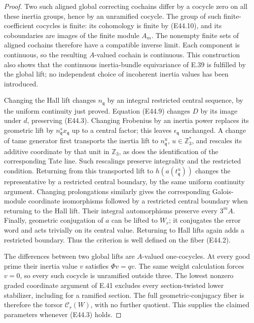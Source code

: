 \begin{proof}
Two such aligned global correcting
cochains differ by a cocycle zero on
all these inertia groups, hence by
an unramified cocycle. The group of
such finite-coefficient cocycles is
finite: its cohomology is finite by
(E44.10), and its coboundaries are
images of the finite module $A_m$.
The nonempty finite sets of aligned
cochains therefore have a compatible
inverse limit. Each component is
continuous, so the resulting
$A$-valued cochain is continuous.
This construction also shows that
the continuous inertia-bundle
equivariance of E.39 is fulfilled by
the global lift; no independent
choice of incoherent inertia values
has been introduced.

Changing the Hall lift changes
$n_{\mathfrak q}$ by an integral
restricted central sequence, by
the uniform continuity just proved.
Equation (E44.9) changes $D$ by its
image under $d$, preserving (E44.3).
Changing Frobenius by an inertia
power replaces its geometric lift
by $n_{\mathfrak q}^s x_{\mathfrak q}$
up to a central factor; this leaves
$\epsilon_{\mathfrak q}$ unchanged.
A change of tame generator first transports
the inertia lift to $n_{\mathfrak q}^u$,
$u\in\mathbb Z_3^*$, and rescales
its additive coordinate by that unit
in $\mathbb Z_3$, as does the
identification of the corresponding
Tate line. Such rescalings preserve
integrality and the restricted
condition. Returning from this
transported lift to
$h(a(t_{\mathfrak q}^u))$ changes
the representative by a restricted
central boundary, by the same
uniform continuity argument.
Changing prolongations similarly
gives the corresponding Galois-module
coordinate isomorphisms followed
by a restricted central boundary
when returning to the Hall lift.
Their integral automorphisms preserve
every $3^mA$. Finally, geometric
conjugation of $a$ can be lifted
to $W_r$; it conjugates the error
word and acts trivially on its
central value. Returning to Hall
lifts again adds a restricted
boundary. Thus the criterion is
well defined on the fiber (E44.2).

The differences between two global
lifts are $A$-valued one-cocycles.
At every good prime their inertia
value $v$ satisfies $\Phi v=qv$.
The same weight calculation forces
$v=0$, so every such cocycle is
unramified outside three. The
lowest nonzero graded coordinate
argument of E.41 excludes every
section-twisted lower stabilizer,
including for a ramified section.
The full geometric-conjugacy
fiber is therefore the torsor
$\mathcal C_r(W)$, with no further
quotient. This supplies the claimed
parameters whenever (E44.3) holds.


\end{proof}
